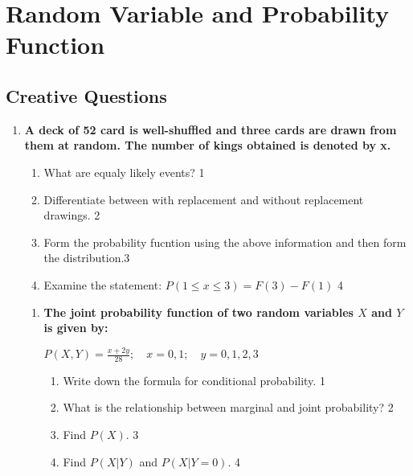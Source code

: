 \documentclass[a4paper,oneside, margin=1.4in]{book}
\begin{document}
\chapter{Random Variable and Probability Function} 

\section{Creative Questions}

  \begin{enumerate}
  
 \item
	  \textbf{A deck of 52 card is well-shuffled and three cards are drawn from them at random. The number of kings obtained is denoted by x.} 
  
  \begin{enumerate}
    \item
	What are equaly likely events? \hfill 1
    \item
	Differentiate between with replacement and without replacement drawings. \hfill 2
    \item  
	Form the probability fucntion using the above information and then form the distribution.\hfill 3
    \item
	Examine the statement: $P(1 \le x \le 3) = F(3)-F(1)$ \hfill 4
  \end{enumerate}
  
\begin{enumerate}

  \item
  \textbf{The joint probability function of two random variables \( X \) and \( Y \) is given by:}
  
  \begin{center}
  \( \displaystyle P(X,Y) = \frac{x + 2y}{28}; \quad x = 0, 1; \quad y = 0, 1, 2, 3 \)
  \end{center}
 
  \begin{enumerate}
    \item
    	Write down the formula for conditional probability. \hfill 1
    \item
    	What is the relationship between marginal and joint probability? \hfill 2
    \item
    	Find \( P(X) \). \hfill 3
    \item
     	Find \( P(X \vert Y) \) and \( P(X \vert Y = 0) \). \hfill 4
  \end{enumerate}


\end{enumerate}
\end{enumerate}
\end{document}
